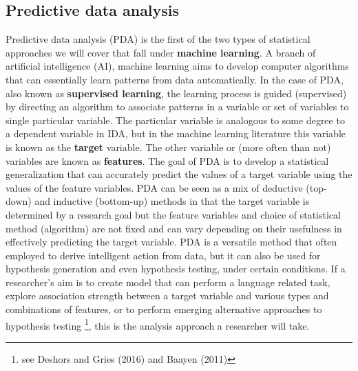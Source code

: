 \documentclass[
  letterpaper,
]{latex/krantz}
\begin{document}
\hypertarget{predictive-data-analysis}{%
\subsection{Predictive data analysis}\label{predictive-data-analysis}}

Predictive data analysis (PDA) is the first of the two types of
statistical approaches we will cover that fall under \textbf{machine
learning}. A branch of artificial intelligence (AI), machine learning
aims to develop computer algorithms that can essentially learn patterns
from data automatically. In the case of PDA, also known as
\textbf{supervised learning}, the learning process is guided
(supervised) by directing an algorithm to associate patterns in a
variable or set of variables to single particular variable. The
particular variable is analogous to some degree to a dependent variable
in IDA, but in the machine learning literature this variable is known as
the \textbf{target} variable. The other variable or (more often than
not) variables are known as \textbf{features}. The goal of PDA is to
develop a statistical generalization that can accurately predict the
values of a target variable using the values of the feature variables.
PDA can be seen as a mix of deductive (top-down) and inductive
(bottom-up) methods in that the target variable is determined by a
research goal but the feature variables and choice of statistical method
(algorithm) are not fixed and can vary depending on their usefulness in
effectively predicting the target variable. PDA is a versatile method
that often employed to derive intelligent action from data, but it can
also be used for hypothesis generation and even hypothesis testing,
under certain conditions. If a researcher's aim is to create model that
can perform a language related task, explore association strength
between a target variable and various types and combinations of
features, or to perform emerging alternative approaches to hypothesis
testing \footnote{see Deshors and Gries (2016) and Baayen (2011)}, this
is the analysis approach a researcher will take.
\end{document}
